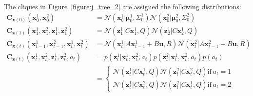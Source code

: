 The cliques in Figure~\ref{figure:j_tree_2} are assigned the following distributions:
\begin{align}
\pmb{C}_{\pmb{x} \left( 0 \right)} \left( \pmb{x}_{0}^{1},  \pmb{x}_{0}^{2} \right) &= \mathcal{N} \left( \pmb{x}_{0}^{1} | \pmb{\mu}_{0}^{1}, \Sigma_{0}^{1} \right)  \mathcal{N} \left( \pmb{x}_{0}^{2} | \pmb{\mu}_{0}^{2}, \Sigma_{0}^{2} \right) \\
\pmb{C}_{\pmb{z} \left( 1 \right)} \left( \pmb{x}_{1}^{1},  \pmb{x}_{1}^{2}, \pmb{z}_{1}^{1},  \pmb{z}_{1}^{2} \right) &=  \mathcal{N} \left( \pmb{z}_{1}^{1} | C \pmb{x}_{1}^{1}, Q \right)  \mathcal{N}   \left( \pmb{z}_{2}^{1} | C \pmb{x}_{2}^{1}, Q \right)  \\
\pmb{C}_{\pmb{x} \left( t \right)} \left( \pmb{x}_{t-1}^{1},  \pmb{x}_{t-1}^{2}, \pmb{x}_{t}^{1},  \pmb{x}_{t}^{2} \right) &=  \mathcal{N} \left( \pmb{x}_{t}^{1} | A \pmb{x}_{t-1}^{1} + B \pmb{u}, R \right)  \mathcal{N} \left( \pmb{x}_{t}^{2} | A \pmb{x}_{t-1}^{2} + B \pmb{u}, R \right)  \\
\pmb{C}_{\pmb{z} \left( t \right)} \left( \pmb{x}_{t}^{1},  \pmb{x}_{t}^{2}, \pmb{z}_{t}^{1},  \pmb{z}_{t}^{2}, a_{t} \right) &= p\left(\pmb{z}_{t}^{1} | \pmb{x}_{t}^{1}, \pmb{x}_{t}^{2}, a_{t} \right) p\left(\pmb{z}_{t}^{2} | \pmb{x}_{t}^{1}, \pmb{x}_{t}^{2}, a_{t} \right) p\left(a_{t}\right) \nonumber \\
&= \begin{cases}
 \mathcal{N}\left( \pmb{z}_{t}^{1} | C \pmb{x}_{t}^{1}, Q \right)  \mathcal{N}\left( \pmb{z}_{t}^{2} | C \pmb{x}_{t}^{2}, Q \right)  \mbox{if} \ a_{t} = 1 \\
 \mathcal{N}\left( \pmb{z}_{t}^{1} | C \pmb{x}_{t}^{2}, Q \right)  \mathcal{N}\left( \pmb{z}_{t}^{2} | C \pmb{x}_{t}^{1}, Q \right)  \mbox{if} \ a_{t} = 2 
\end{cases}
\end{align}

